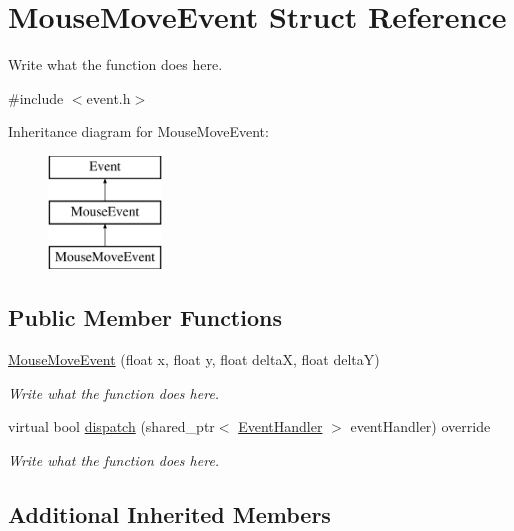 \hypertarget{structMouseMoveEvent}{\section{Mouse\+Move\+Event Struct Reference}
\label{structMouseMoveEvent}
}


Write what the function does here.  




{\ttfamily \#include $<$event.\+h$>$}

Inheritance diagram for Mouse\+Move\+Event\+:\begin{figure}[H]
\begin{center}
\leavevmode
\includegraphics[height=3.000000cm]{structMouseMoveEvent}
\end{center}
\end{figure}
\subsection*{Public Member Functions}
\begin{DoxyCompactItemize}
\item 
\hyperlink{structMouseMoveEvent_abf421414902d34aa2d9435cc485fc4c8}{Mouse\+Move\+Event} (float x, float y, float delta\+X, float delta\+Y)
\begin{DoxyCompactList}\small\item\em Write what the function does here. \end{DoxyCompactList}\item 
virtual bool \hyperlink{structMouseMoveEvent_a2718ebd4f6f40d533773e59530372d62}{dispatch} (shared\+\_\+ptr$<$ \hyperlink{structEventHandler}{Event\+Handler} $>$ event\+Handler) override
\begin{DoxyCompactList}\small\item\em Write what the function does here. \end{DoxyCompactList}\end{DoxyCompactItemize}
\subsection*{Additional Inherited Members}


